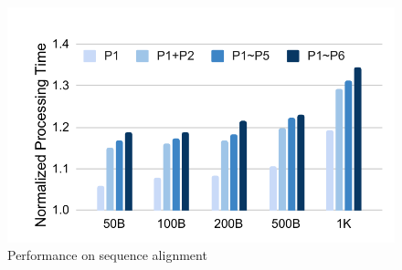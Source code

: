 \begin{figure}[htbp]
\centerline{\includegraphics[scale=0.48]{figures/fg-nw-perf.pdf}}
\caption{Performance on sequence alignment}\label{fg-nw-perf}
\end{figure}